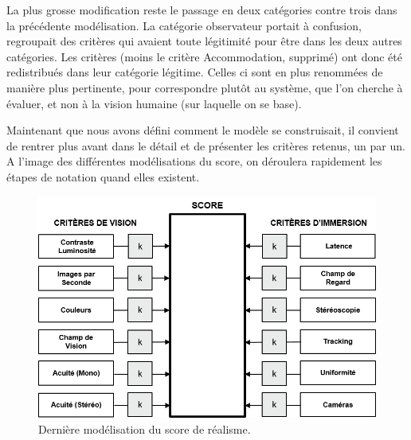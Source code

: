 	\par La plus grosse modification reste le passage en deux catégories contre trois dans la précédente modélisation. La catégorie observateur portait à confusion, regroupait des critères qui avaient toute légitimité pour être dans les deux autres catégories. Les critères (moins le critère Accommodation, supprimé) ont donc été redistribués dans leur catégorie légitime. Celles ci sont en plus renommées de manière plus pertinente, pour correspondre plutôt au système, que l'on cherche à évaluer, et non à la vision humaine (sur laquelle on se base).
	
	\par Maintenant que nous avons défini comment le modèle se construisait, il convient de rentrer plus avant dans le détail et de présenter les critères retenus, un par un. A l'image des différentes modélisations du score, on déroulera rapidement les étapes de notation quand elles existent.
	
	\begin{figure}[h]
		\centering
		\includegraphics[scale=1.1]{Figures/ModeleDefinitif_2}
		\caption{Dernière modélisation du score de réalisme.}
		\label{fig:modèle_définitif}
	\end{figure}